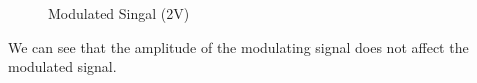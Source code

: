 \documentclass[12pt]{article}
\begin{document}
\begin{figure}[H]
    \centering
    \caption{Modulated Singal (2V)}
\end{figure}
We can see that the amplitude of the modulating signal does not affect the modulated signal.
\end{document}
